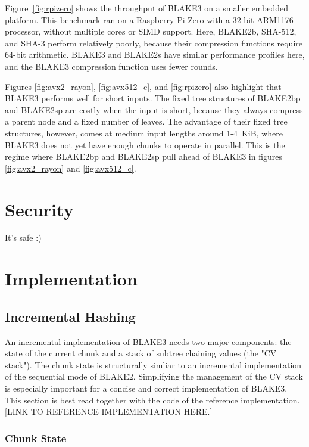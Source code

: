 \documentclass[11pt,notitlepage,a4paper]{article}
\begin{document}
Figure~\ref{fig:rpizero} shows the throughput of BLAKE3 on a smaller embedded
platform. This benchmark ran on a Raspberry Pi Zero with a 32-bit ARM1176
processor, without multiple cores or SIMD support. Here, BLAKE2b, SHA-512, and
SHA-3 perform relatively poorly, because their compression functions require
64-bit arithmetic. BLAKE3 and BLAKE2s have similar performance profiles here,
and the BLAKE3 compression function uses fewer rounds.

Figures \ref{fig:avx2_rayon}, \ref{fig:avx512_c}, and \ref{fig:rpizero} also
highlight that BLAKE3 performs well for short inputs. The fixed tree structures
of BLAKE2bp and BLAKE2sp are costly when the input is short, because they
always compress a parent node and a fixed number of leaves. The advantage of
their fixed tree structures, however, comes at medium input lengths around
1-4~KiB, where BLAKE3 does not yet have enough chunks to operate in parallel.
This is the regime where BLAKE2bp and BLAKE2sp pull ahead of BLAKE3 in figures
\ref{fig:avx2_rayon} and \ref{fig:avx512_c}.

\section{Security}\label{sec:security}

It's safe :)

\section{Implementation}\label{sec:implementation}

\subsection{Incremental Hashing}\label{sec:incremental}

An incremental implementation of BLAKE3 needs two major components: the state
of the current chunk and a stack of subtree chaining values (the "CV stack").
The chunk state is structurally simliar to an incremental implementation of the
sequential mode of BLAKE2. Simplifying the management of the CV stack is
especially important for a concise and correct implementation of BLAKE3. This
section is best read together with the code of the reference implementation.
[LINK TO REFERENCE IMPLEMENTATION HERE.]

\subsubsection{Chunk State}\label{sec:chunkstate}
\end{document}
